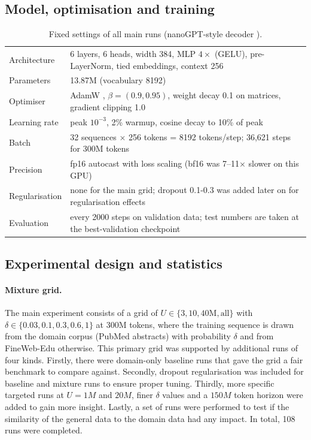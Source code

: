 \documentclass[10pt,a4paper]{article}
\begin{document}
\subsection{Model, optimisation and training}
\begin{table}[h]\centering\small
\begin{tabular}{@{}ll@{}}\toprule
Architecture & 6 layers, 6 heads, width 384, MLP $4\times$ (GELU), pre-LayerNorm, tied embeddings, context 256 \\
Parameters & 13.87M (vocabulary 8192) \\
Optimiser & AdamW \citep{loshchilov2019adamw}, $\beta=(0.9,0.95)$, weight decay 0.1 on matrices, gradient clipping 1.0 \\
Learning rate & peak $10^{-3}$, 2\% warmup, cosine decay to 10\% of peak \\
Batch & 32 sequences $\times$ 256 tokens = 8192 tokens/step; 36,621 steps for 300M tokens \\
Precision & fp16 autocast with loss scaling (bf16 was 7--11$\times$ slower on this GPU) \\
Regularisation & none for the main grid; dropout 0.1-0.3 was added later on for regularisation effects\\
Evaluation & every 2000 steps on validation data; test numbers are taken at the best-validation checkpoint \\
\bottomrule\end{tabular}
\caption{Fixed settings of all main runs (nanoGPT-style decoder \citep{karpathy2022nanogpt}).}
\end{table}

\subsection{Experimental design and statistics}
\paragraph{Mixture grid.} The main experiment consists of a grid of $U\in\{3,10,40\text{M},\text{all}\}$ with $\delta\in\{0.03,0.1,0.3,0.6,1\}$ at 300M tokens, where the training sequence is drawn from the domain corpus (PubMed abstracts) with probability $\delta$ and from FineWeb-Edu otherwise. This primary grid was supported by additional runs of four kinds. Firstly, there were domain-only baseline runs that gave the grid a fair benchmark to compare against. Secondly, dropout regularisation was included for baseline and mixture runs to ensure proper tuning. Thirdly, more specific targeted runs at $U=1M$ and $20M$, finer $\delta$ values and a $150M$ token horizon were added to gain more insight. Lastly, a set of runs were performed to test if the similarity of the general data to the domain data had any impact. In total, 108 runs were completed.
\end{document}
